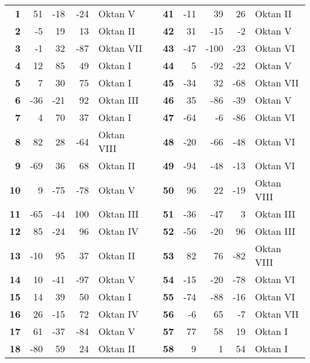 \begin{longtable}[c]{rrrrlcrrrrl}
\textbf{1} & 51    & -18   & -24   & Oktan V &       & \textbf{41} & -11   & 39    & 26    & Oktan II\\
\textbf{2} & -5    & 19    & 13    & Oktan II &       & \textbf{42} & 31    & -15   & -2    & Oktan V \\
\textbf{3} & -1    & 32    & -87   & Oktan VII &       & \textbf{43} & -47   & -100  & -23   & Oktan VI \\
\textbf{4} & 12    & 85    & 49    & Oktan I &       & \textbf{44} & 5     & -92   & -22   & Oktan V \\
\textbf{5} & 7     & 30    & 75    & Oktan I &       & \textbf{45} & -34   & 32    & -68   & Oktan VII \\
\textbf{6} & -36   & -21   & 92    & Oktan III &       & \textbf{46} & 35    & -86   & -39   & Oktan V \\
\textbf{7} & 4     & 70    & 37    & Oktan I &       & \textbf{47} & -64   & -6    & -86   & Oktan VI \\
\textbf{8} & 82    & 28    & -64   & Oktan VIII &       & \textbf{48} & -20   & -66   & -48   & Oktan VI \\
\textbf{9} & -69   & 36    & 68    & Oktan II &       & \textbf{49} & -94   & -48   & -13   & Oktan VI \\
\textbf{10} & 9     & -75   & -78   & Oktan V &       & \textbf{50} & 96    & 22    & -19   & Oktan VIII \\
\textbf{11} & -65   & -44   & 100   & Oktan III &       & \textbf{51} & -36   & -47   & 3     & Oktan III \\
\textbf{12} & 85    & -24   & 96    & Oktan IV &       & \textbf{52} & -56   & -20   & 96    & Oktan III \\
\textbf{13} & -10   & 95    & 37    & Oktan II &       & \textbf{53} & 82    & 76    & -82   & Oktan VIII \\
\textbf{14} & 10    & -41   & -97   & Oktan V &       & \textbf{54} & -15   & -20   & -78   & Oktan VI \\
\textbf{15} & 14    & 39    & 50    & Oktan I &       & \textbf{55} & -74   & -88   & -16   & Oktan VI \\
\textbf{16} & 26    & -15   & 72    & Oktan IV &       & \textbf{56} & -6    & 65    & -7    & Oktan VII \\
\textbf{17} & 61    & -37   & -84   & Oktan V &       & \textbf{57} & 77    & 58    & 19    & Oktan I \\
\textbf{18} & -80   & 59    & 24    & Oktan II &       & \textbf{58} & 9     & 1     & 54    & Oktan I \\

\end{longtable}
